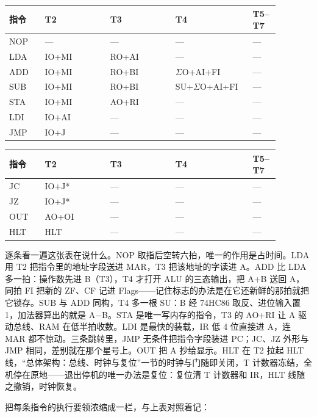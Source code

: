 \begin{longtable}{L{0.12\linewidth}L{0.22\linewidth}L{0.22\linewidth}L{0.26\linewidth}L{0.06\linewidth}}
\toprule
指令 & T2 & T3 & T4 & T5–T7 \\
\midrule
NOP & — & — & — & — \\\tablerowrule
LDA & IO+MI & RO+AI & — & — \\\tablerowrule
ADD & IO+MI & RO+BI & $\Sigma$O+AI+FI & — \\\tablerowrule
SUB & IO+MI & RO+BI & SU+$\Sigma$O+AI+FI & — \\\tablerowrule
STA & IO+MI & AO+RI & — & — \\\tablerowrule
LDI & IO+AI & — & — & — \\\tablerowrule
JMP & IO+J & — & — & — \\
\bottomrule
\end{longtable}

\begin{longtable}{L{0.12\linewidth}L{0.22\linewidth}L{0.22\linewidth}L{0.26\linewidth}L{0.06\linewidth}}
\toprule
指令 & T2 & T3 & T4 & T5–T7 \\
\midrule
JC & IO+J* & — & — & — \\\tablerowrule
JZ & IO+J* & — & — & — \\\tablerowrule
OUT & AO+OI & — & — & — \\\tablerowrule
HLT & HLT & — & — & — \\
\bottomrule
\end{longtable}

逐条看一遍这张表在说什么。NOP 取指后空转六拍，唯一的作用是占时间。LDA 用 T2 把指令里的地址字段送进 MAR，T3 把该地址的字读进 A。ADD 比 LDA 多一拍：操作数先进 B（T3），T4 才打开 ALU 的三态输出，把 A+B 送回 A，同拍 FI 把新的 ZF、CF 记进 Flags——记住标志的办法是在它还新鲜的那拍就把它锁存。SUB 与 ADD 同构，T4 多一根 SU：B 经 74HC86 取反、进位输入置 1，加法器算出的就是 A−B。STA 是唯一写内存的指令，T3 的 AO+RI 让 A 驱动总线、RAM 在低半拍收数。LDI 是最快的装载，IR 低 4 位直接进 A，连 MAR 都不惊动。三条跳转里，JMP 无条件把指令字段装进 PC；JC、JZ 外形与 JMP 相同，差别就在那个星号上。OUT 把 A 抄给显示。HLT 在 T2 拉起 HLT 线，“总体架构：总线、时钟与复位”一节的时钟与门随即关闭，T 计数器冻结，全机停在原地——退出停机的唯一办法是复位：复位清 T 计数器和 IR，HLT 线随之撤销，时钟恢复。

把每条指令的执行要领浓缩成一栏，与上表对照着记：

